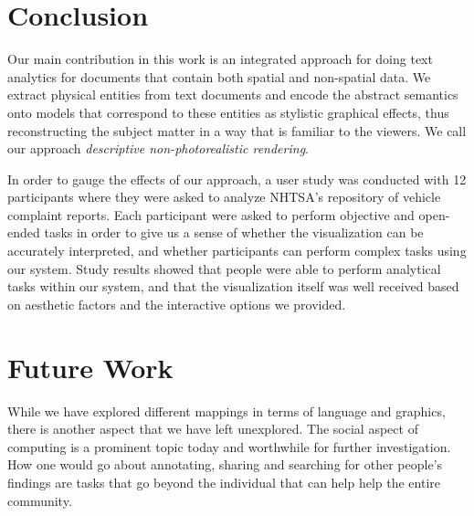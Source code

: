 \section{Conclusion}
Our main contribution in this work is an integrated approach for doing text
analytics for documents that contain both spatial and non-spatial data. We extract
physical entities from text documents and encode the abstract semantics onto 
\threed models that correspond to these entities as stylistic graphical effects, thus 
reconstructing the subject matter in a way that is familiar to the viewers. We call
our approach \emph{descriptive non-photorealistic rendering}.

In order to gauge the effects of our approach, a user study was conducted with
12 participants where they were asked to analyze NHTSA's repository of vehicle
complaint reports. Each participant were asked to perform objective and
open-ended tasks in order to give us a sense of whether the visualization can be
accurately interpreted, and whether participants can perform complex tasks using our system.
Study results showed that people were able to perform analytical tasks
within our system, and that the visualization itself was well received based on
aesthetic factors and the interactive options we provided. 






\section{Future Work}
While we have explored different mappings in terms of language and graphics,
there is another aspect that we have left unexplored. The social aspect of
computing is a prominent topic today and worthwhile for further investigation.
How one would go about annotating, sharing and searching for other people's
findings are tasks that go beyond the individual that can help help the entire
community.

